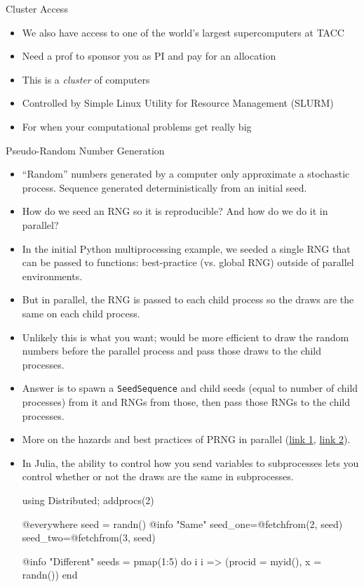 \documentclass[aspectratio=1610,handout]{beamer}
\begin{document}
\begin{frame}{Cluster Access}
    \begin{itemize}
        \item We also have access to one of the world's largest supercomputers at TACC
        \item Need a prof to sponsor you as PI and pay for an allocation
        \item This is a \textit{cluster} of computers
        \item Controlled by Simple Linux Utility for Resource Management (SLURM)
        \item For when your computational problems get really big
    \end{itemize}
\end{frame}

\begin{frame}{Pseudo-Random Number Generation}
    \begin{itemize}
        \item ``Random'' numbers generated by a computer only approximate a stochastic process. Sequence generated deterministically from an initial seed.
        \item How do we seed an RNG so it is reproducible?  And how do we do it in parallel?
        \item In the initial Python multiprocessing example, we seeded a single RNG that can be passed to functions: best-practice (vs. global RNG) outside of parallel environments.
        \item But in parallel, the RNG is passed to each child process so the draws are the same on each child process.
        \item Unlikely this is what you want; would be more efficient to draw the random numbers before the parallel process and pass those draws to the child processes.
        \item Answer is to spawn a \verb|SeedSequence| and child seeds (equal to number of child processes) from it and RNGs from those, then pass those RNGs to the child processes.
        \item More on the hazards and best practices of PRNG in parallel (\href{https://blog.scientific-python.org/numpy/numpy-rng/}{link 1}, \href{https://numpy.org/doc/stable/reference/random/parallel.html}{link 2}).
        \newpage
        \item In Julia, the ability to control how you send variables to subprocesses lets you control whether or not the draws are the same in subprocesses.\\
        \begin{jllisting}
using Distributed; addprocs(2)
            
@everywhere seed = randn()
@info "Same" seed_one=@fetchfrom(2, seed) seed_two=@fetchfrom(3, seed)

@info "Different" seeds = pmap(1:5) do i
    i => (procid = myid(), x = randn())
end
        \end{jllisting}
    \end{itemize}
\end{frame}
\end{document}
